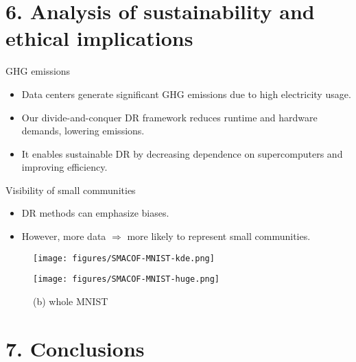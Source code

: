 \documentclass[10pt]{beamer}
\begin{document}
\section{6. Analysis of sustainability and ethical implications}

\begin{frame}{GHG emissions}
    \begin{itemize}
        \item \alert{Data centers} generate significant GHG emissions due to \alert{high electricity usage}.
        \item Our \alert{divide-and-conquer DR} framework reduces runtime and hardware demands, lowering emissions.
        \item It enables \alert{sustainable DR} by decreasing dependence on supercomputers and improving efficiency.
    \end{itemize}
\end{frame}


\begin{frame}{Visibility of small communities}
    \begin{itemize}
        \item DR methods can \alert{emphasize biases}.
        \item However, more data $\Rightarrow$ more likely to represent small communities.
    \end{itemize}
    \begin{figure}
        \centering
        \begin{minipage}{0.61\textwidth}
            \centering
            \texttt{[image: figures/SMACOF-MNIST-kde.png]}
            \caption*{\small (a) 5,000-point subset of MNIST}
        \end{minipage}
        \hfill
        \begin{minipage}{0.37\textwidth}
            \centering
            \texttt{[image: figures/SMACOF-MNIST-huge.png]}
            \caption*{\small (b) whole MNIST}
        \end{minipage}
    \end{figure}
\end{frame}

\section{7. Conclusions}
\end{document}
